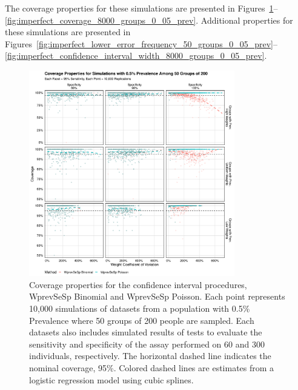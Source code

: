 \documentclass[AMA,STIX1COL]{WileyNJD-v2}
\begin{document}
The coverage properties for these simulations are presented in Figures~\ref{fig:imperfect_coverage_50_groups_0_005_prev}--\ref{fig:imperfect_coverage_8000_groups_0_05_prev}.
Additional properties for these simulations are presented in Figures~\ref{fig:imperfect_lower_error_frequency_50_groups_0_05_prev}--\ref{fig:imperfect_confidence_interval_width_8000_groups_0_05_prev}.

\begin{figure}
\centering
\includegraphics[width=0.8\textwidth]{figures/imperfect_coverage_50_groups_0_005_prev.pdf}
\caption{Coverage properties for the confidence interval procedures, WprevSeSp Binomial and WprevSeSp Poisson.
Each point represents 10,000 simulations of datasets from a population with 0.5\% Prevalence where 50 groups of 200 people are sampled.
Each datasets also includes simulated results of tests to evaluate the sensitivity and specificity of the assay performed on 60 and 300 individuals, respectively.
The horizontal dashed line indicates the nominal coverage, 95\%.
Colored dashed lines are estimates from a logistic regression model using cubic splines.}
\label{fig:imperfect_coverage_50_groups_0_005_prev}
\end{figure}
\end{document}
